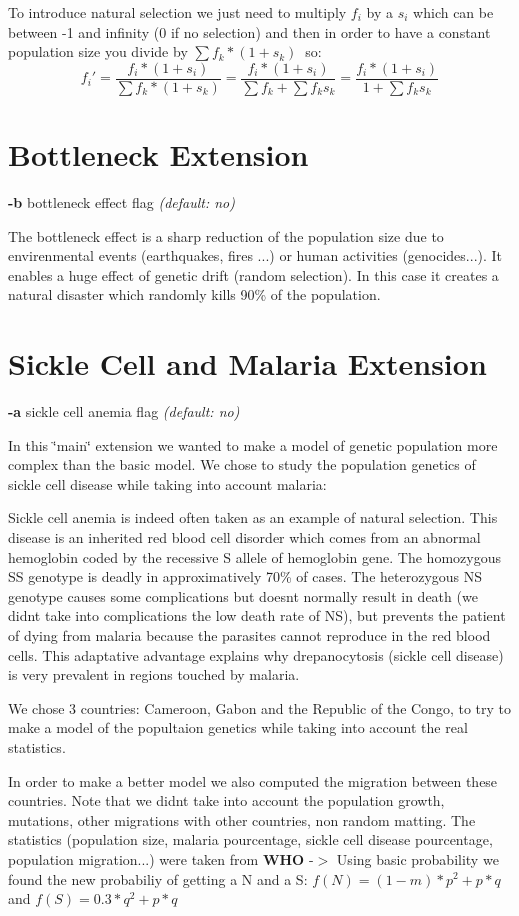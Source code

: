 To introduce natural selection we just need to multiply $ f_i $ by a $ s_i $ which can be between -\/1 and infinity (0 if no selection) and then in order to have a constant population size you divide by $ \sum f_k*(1+s_k)\ $ so\+: \[ f_i'= \frac{f_i*(1+s_i)}{\sum f_k*(1+s_k)} = \frac{f_i*(1+s_i)}{\sum f_k +\sum f_ks_k} = \frac{f_i*(1+s_i)}{1 +\sum f_ks_k} \] \hypertarget{index_botlleneck_sec}{}\section{Bottleneck Extension}\label{index_botlleneck_sec}
{\bfseries -\/b} bottleneck effect flag {\itshape  (default\+: no)}

The bottleneck effect is a sharp reduction of the population size due to envirenmental events (earthquakes, fires ...) or human activities (genocides...). It enables a huge effect of genetic drift (random selection). In this case it creates a natural disaster which randomly kills 90\% of the population. \hypertarget{index_anemia_sec}{}\section{Sickle Cell and Malaria Extension}\label{index_anemia_sec}
{\bfseries -\/a} sickle cell anemia flag {\itshape  (default\+: no)}

In this \char`\"{}main\char`\"{} extension we wanted to make a model of genetic population more complex than the basic model. We chose to study the population genetics of sickle cell disease while taking into account malaria\+:
\begin{DoxyItemize}
\item Sickle cell anemia is indeed often taken as an example of natural selection. This disease is an inherited red blood cell disorder which comes from an abnormal hemoglobin coded by the recessive S allele of hemoglobin gene. The homozygous SS genotype is deadly in approximatively 70\% of cases. The heterozygous NS genotype causes some complications but doesn\textquotesingle{}t normally result in death (we didn\textquotesingle{}t take into complications the low death rate of NS), but prevents the patient of dying from malaria because the parasites cannot reproduce in the red blood cells. This adaptative advantage explains why drepanocytosis (sickle cell disease) is very prevalent in regions touched by malaria.
\item We chose 3 countries\+: Cameroon, Gabon and the Republic of the Congo, to try to make a model of the popultaion genetics while taking into account the real statistics.
\item In order to make a better model we also computed the migration between these countries. Note that we didn\textquotesingle{}t take into account the population growth, mutations, other migrations with other countries, non random matting. The statistics (population size, malaria pourcentage, sickle cell disease pourcentage, population migration...) were taken from {\bfseries W\+HO}  -\/$>$ Using basic probability we found the new probabiliy of getting a N and a S\+: $ f(N)= (1-m)*p^{2} + p*q $ and $ f(S)= 0.3*q^{2} + p*q $
\end{DoxyItemize}

